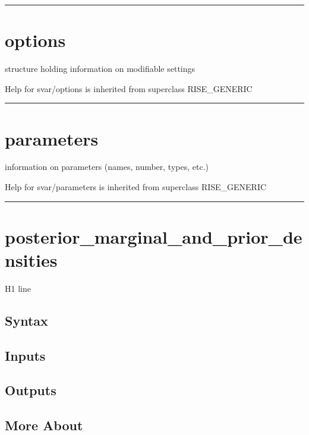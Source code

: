\documentclass[letterpaper,10pt,english]{sphinxmanual}
\begin{document}
\bigskip\hrule{}\bigskip



\section{options}
\label{classes/models/@svar/svar:id82}\label{classes/models/@svar/svar:options}
structure holding information on modifiable settings

Help for svar/options is inherited from superclass RISE\_GENERIC


\bigskip\hrule{}\bigskip



\section{parameters}
\label{classes/models/@svar/svar:id83}\label{classes/models/@svar/svar:parameters}
information on parameters (names, number, types, etc.)

Help for svar/parameters is inherited from superclass RISE\_GENERIC


\bigskip\hrule{}\bigskip



\section{posterior\_marginal\_and\_prior\_densities}
\label{classes/models/@svar/svar:id84}\label{classes/models/@svar/svar:posterior-marginal-and-prior-densities}
H1 line


\subsection{Syntax}
\label{classes/models/@svar/svar:id85}

\subsection{Inputs}
\label{classes/models/@svar/svar:id86}

\subsection{Outputs}
\label{classes/models/@svar/svar:id87}

\subsection{More About}
\label{classes/models/@svar/svar:id88}
\end{document}
